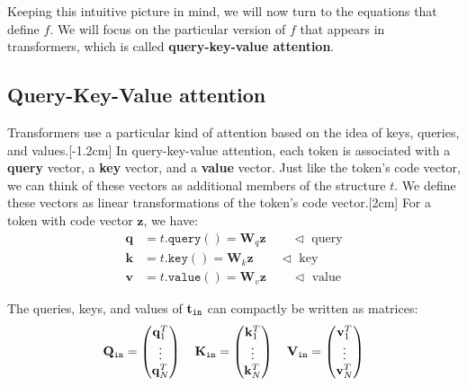 Keeping this intuitive picture in mind, we will now turn to the equations that define $f$. We will focus on the particular version of $f$ that appears in transformers, which is called \textbf{query-key-value attention}.

\subsection{Query-Key-Value attention}
Transformers use a particular kind of attention based on the idea of keys, queries, and values.[-1.2cm] In query-key-value attention, each token is associated with a \textbf{query} vector, a \textbf{key} vector, and a \textbf{value} vector. Just like the token's code vector, we can think of these vectors as additional members of the structure $t$. We define these vectors as linear transformations of the token's code vector.[2cm] For a token with code vector $\mathbf{z}$, we have:
\begin{align}
    \mathbf{q} &= t.\texttt{query}() = \mathbf{W}_q \mathbf{z} \quad\quad \triangleleft \text{ query}\\
    \mathbf{k} &= t.\texttt{key}() = \mathbf{W}_k \mathbf{z} \quad\quad \triangleleft \text{ key}\\
    \mathbf{v} &= t.\texttt{value}() = \mathbf{W}_v \mathbf{z} \quad\quad \triangleleft \text{ value}
\end{align}

The queries, keys, and values of $\mathbf{t}_{\texttt{in}}$ can compactly be written as matrices:
\begin{equation}
    \mathbf{Q}_{\texttt{in}} = 
     \begin{pmatrix}
        \mathbf{q}_1^T\\
        \vdots \\
        \mathbf{q}_N^T\\
    \end{pmatrix}
    \quad
    \mathbf{K}_{\texttt{in}} = 
     \begin{pmatrix}
        \mathbf{k}_1^T\\
        \vdots \\
        \mathbf{k}_N^T\\
    \end{pmatrix}
    \quad
    \mathbf{V}_{\texttt{in}} = 
     \begin{pmatrix}
        \mathbf{v}_1^T\\
        \vdots \\
        \mathbf{v}_N^T\\
    \end{pmatrix}
\end{equation}

